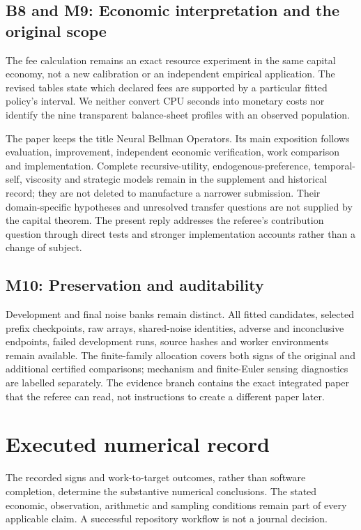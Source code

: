 \subsection*{B8 and M9: Economic interpretation and the original scope}
The fee calculation remains an exact resource experiment in the same capital economy, not a new calibration or an independent empirical application. The revised tables state which declared fees are supported by a particular fitted policy's interval. We neither convert CPU seconds into monetary costs nor identify the nine transparent balance-sheet profiles with an observed population.

The paper keeps the title Neural Bellman Operators. Its main exposition follows evaluation, improvement, independent economic verification, work comparison and implementation. Complete recursive-utility, endogenous-preference, temporal-self, viscosity and strategic models remain in the supplement and historical record; they are not deleted to manufacture a narrower submission. Their domain-specific hypotheses and unresolved transfer questions are not supplied by the capital theorem. The present reply addresses the referee's contribution question through direct tests and stronger implementation accounts rather than a change of subject.

\subsection*{M10: Preservation and auditability}
Development and final noise banks remain distinct. All fitted candidates, selected prefix checkpoints, raw arrays, shared-noise identities, adverse and inconclusive endpoints, failed development runs, source hashes and worker environments remain available. The finite-family allocation covers both signs of the original and additional certified comparisons; mechanism and finite-Euler sensing diagnostics are labelled separately. The evidence branch contains the exact integrated paper that the referee can read, not instructions to create a different paper later.

\section*{Executed numerical record}


The recorded signs and work-to-target outcomes, rather than software completion, determine the substantive numerical conclusions. The stated economic, observation, arithmetic and sampling conditions remain part of every applicable claim. A successful repository workflow is not a journal decision.
